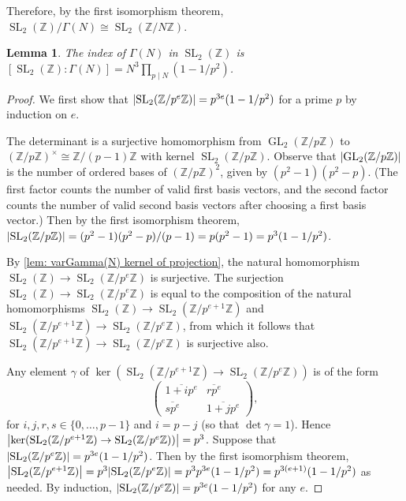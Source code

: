 \documentclass[10pt,leqno,twoside]{article}
\theoremstyle{plain}
\newtheorem{lemma}[lem]{Lemma}
\theoremstyle{definition}
\numberwithin{equation}{section}
\numberwithin{lem}{section}
\DeclareMathOperator{\GL}{GL}
\DeclareMathOperator{\SL}{SL}
\newcommand{\slz}{\SL_2(\mathbb{Z})}
\begin{document}
Therefore, by the first isomorphism theorem, $\slz/\varGamma(N)\cong \SL_2(\mathbb{Z}/N\mathbb{Z})$. 
\begin{lemma}
    The index of $\varGamma(N)$ in $\slz$ is $[\slz: \varGamma(N)] = N^3\prod_{p\mid N}(1-1/p^2)$.
\end{lemma}
\begin{proof}
    We first show that $\abs{\SL_2(\mathbb{Z}/p^e\mathbb{Z})} = p^{3e}(1-1/p^2)$ for a prime $p$ by induction on $e$.

    The determinant is a surjective homomorphism from $\GL_2(\mathbb{Z}/p\mathbb{Z})$ to $(\mathbb{Z}/p\mathbb{Z})^\times\cong \mathbb{Z}/(p-1)\mathbb{Z}$ with kernel $\SL_2(\mathbb{Z}/p\mathbb{Z})$. Observe that $\abs{\GL_2(\mathbb{Z}/p\mathbb{Z})}$ is the number of ordered bases of $(\mathbb{Z}/p\mathbb{Z})^2$, given by $(p^2-1)(p^2-p)$. (The first factor counts the number of valid first basis vectors, and the second factor counts the number of valid second basis vectors after choosing a first basis vector.) Then by the first isomorphism theorem, $\abs{\SL_2(\mathbb{Z}/p\mathbb{Z})} = (p^2-1)(p^2-p)/(p-1) = p(p^2-1) = p^3(1-1/p^2)$.
    
    By \cref{lem: varGamma(N) kernel of projection}, the natural homomorphism $\slz\to \SL_2(\mathbb{Z}/p^e\mathbb{Z})$ is surjective. The surjection $\slz\to \SL_2(\mathbb{Z}/p^e\mathbb{Z})$ is equal to the composition of the natural homomorphisms $\slz\to \SL_2(\mathbb{Z}/p^{e+1}\mathbb{Z})$ and $\SL_2(\mathbb{Z}/p^{e+1}\mathbb{Z})\to \SL_2(\mathbb{Z}/p^e\mathbb{Z})$, from which it follows that $\SL_2(\mathbb{Z}/p^{e+1}\mathbb{Z})\to \SL_2(\mathbb{Z}/p^e\mathbb{Z})$ is surjective also.

    Any element $\gamma$ of $\ker(\SL_2(\mathbb{Z}/p^{e+1}\mathbb{Z})\to \SL_2(\mathbb{Z}/p^e\mathbb{Z}))$ is of the form
    \[\begin{pmatrix}
        \overline{1+ip^e} & \overline{rp^e} \\ \overline{sp^e} & \overline{1+jp^e}
    \end{pmatrix},\] for $i,j,r,s\in \{0,\dots,p-1\}$ and $i = p-j$ (so that $\det \gamma = 1$). Hence $\abs{\ker(\SL_2(\mathbb{Z}/p^{e+1}\mathbb{Z})\to \SL_2(\mathbb{Z}/p^e\mathbb{Z}))} = p^3$. Suppose that $\abs{\SL_2(\mathbb{Z}/p^e\mathbb{Z})} = p^{3e}(1-1/p^2)$. Then by the first isomorphism theorem, $\abs{\SL_2(\mathbb{Z}/p^{e+1}\mathbb{Z})} = p^3\abs{\SL_2(\mathbb{Z}/p^e\mathbb{Z})} = p^3p^{3e}(1-1/p^2) = p^{3(e+1)}(1-1/p^2)$ as needed. By induction, $\abs{\SL_2(\mathbb{Z}/p^e\mathbb{Z})} = p^{3e}(1-1/p^2)$ for any $e$.


\end{proof}
\end{document}
